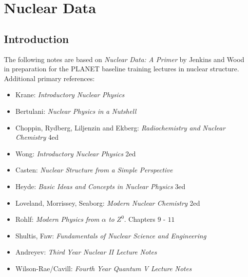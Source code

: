 \chapter{Nuclear Data}

\label{nucdat}
\section{Introduction}
The following notes are based on \textit{Nuclear Data: A Primer} by Jenkins and Wood in preparation for the PLANET baseline training lectures in nuclear structure. Additional primary references: 
\begin{itemize}
    \item Krane: \textit{Introductory Nuclear Physics}
    \item Bertulani: \textit{Nuclear Physics in a Nutshell}
    \item Choppin, Rydberg, Liljenzin and Ekberg: \textit{Radiochemistry and Nuclear Chemistry} 4ed
    \item Wong\label{Wong}: \textit{Introductory Nuclear Physics} 2ed
    \item Casten: \textit{Nuclear Structure from a Simple Perspective}
    \item Heyde: \textit{Basic Ideas and Concepts in Nuclear Physics} 3ed
    \item Loveland, Morrissey, Seaborg: \textit{Modern Nuclear Chemistry} 2ed
    \item Rohlf: \textit{Modern Physics from \(\alpha\) to \(Z^0\)}. Chapters \(9\) - \(11\)
    \item Shultis, Faw: \textit{Fundamentals of Nuclear Science and Engineering}
    \item Andreyev: \textit{Third Year Nuclear II Lecture Notes}
    \item Wilson-Rae/Cavill: \textit{Fourth Year Quantum V Lecture Notes}
\end{itemize}


